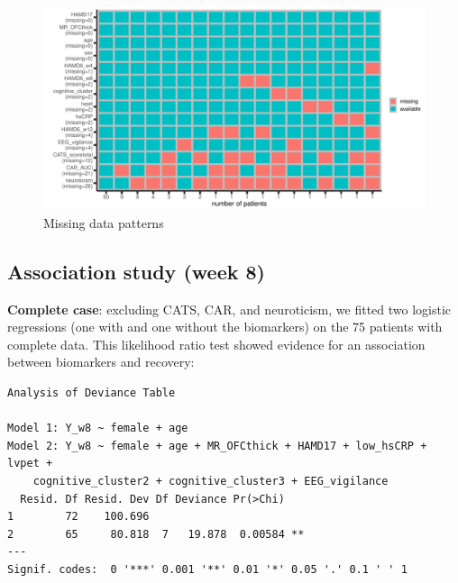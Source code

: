 \documentclass[12pt]{article}
\begin{document}
\begin{figure}[!h]
\centering
\includegraphics[trim={0 0 0 0},width=1\textwidth]{./figures/gg-missingPattern.pdf}
\caption{\label{fig:missingPattern}Missing data patterns}
\end{figure}


\subsection{Association study (week 8)}
\label{sec:org9440ff5}

\textbf{Complete case}: excluding CATS, CAR, and neuroticism, we fitted two
logistic regressions (one with and one without the biomarkers) on the
75 patients with complete data. This likelihood ratio test showed
evidence for an association between biomarkers and recovery:
\begin{verbatim}
Analysis of Deviance Table

Model 1: Y_w8 ~ female + age
Model 2: Y_w8 ~ female + age + MR_OFCthick + HAMD17 + low_hsCRP + lvpet + 
    cognitive_cluster2 + cognitive_cluster3 + EEG_vigilance
  Resid. Df Resid. Dev Df Deviance Pr(>Chi)   
1        72    100.696                        
2        65     80.818  7   19.878  0.00584 **
---
Signif. codes:  0 '***' 0.001 '**' 0.01 '*' 0.05 '.' 0.1 ' ' 1
\end{verbatim}
\end{document}
